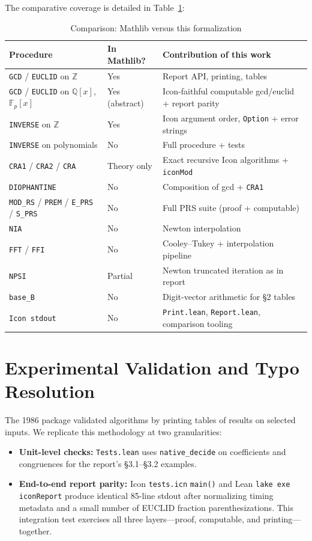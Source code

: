 \documentclass[11pt,a4paper]{article}
\begin{document}
The comparative coverage is detailed in Table~\ref{tab:comparison}:

\begin{table}[htbp]
\centering
\caption{Comparison: Mathlib versus this formalization}
\label{tab:comparison}
\footnotesize
\begin{tabularx}{\textwidth}{@{}l>{\raggedright\arraybackslash}p{2.1cm}>{\raggedright\arraybackslash}X@{}}
\toprule
\textbf{Procedure} & \textbf{In Mathlib?} & \textbf{Contribution of this work} \\
\midrule
\texttt{GCD} / \texttt{EUCLID} on $\mathbb{Z}$ & Yes & Report API, printing, tables \\
\texttt{GCD} / \texttt{EUCLID} on $\mathbb{Q}[x]$, $\mathbb{F}_p[x]$ & Yes (abstract) & Icon-faithful computable gcd/euclid + report parity \\
\texttt{INVERSE} on $\mathbb{Z}$ & Yes & Icon argument order, \texttt{Option} + error strings \\
\texttt{INVERSE} on polynomials & No & Full procedure + tests \\
\texttt{CRA1} / \texttt{CRA2} / \texttt{CRA} & Theory only & Exact recursive Icon algorithms + \texttt{iconMod} \\
\texttt{DIOPHANTINE} & No & Composition of gcd + \texttt{CRA1} \\
\texttt{MOD\_RS} / \texttt{PREM} / \texttt{E\_PRS} / \texttt{S\_PRS} & No & Full PRS suite (proof + computable) \\
\texttt{NIA} & No & Newton interpolation \\
\texttt{FFT} / \texttt{FFI} & No & Cooley–Tukey + interpolation pipeline \\
\texttt{NPSI} & Partial & Newton truncated iteration as in report \\
\texttt{base\_B} & No & Digit-vector arithmetic for \S2 tables \\
\texttt{Icon stdout} & No & \texttt{Print.lean}, \texttt{Report.lean}, comparison tooling \\
\bottomrule
\end{tabularx}
\end{table}

\section{Experimental Validation and Typo Resolution}
The 1986 package validated algorithms by printing tables of results on selected inputs. We replicate this methodology at two granularities:
\begin{itemize}
    \item \textbf{Unit-level checks:} \texttt{Tests.lean} uses \texttt{native\_decide} on coefficients and congruences for the report's \S3.1--\S3.2 examples.
    \item \textbf{End-to-end report parity:} Icon \texttt{tests.icn} \texttt{main()} and Lean \texttt{lake exe iconReport} produce identical 85-line stdout after normalizing timing metadata and a small number of EUCLID fraction parenthesizations. This integration test exercises all three layers---proof, computable, and printing---together.
\end{itemize}
\end{document}
